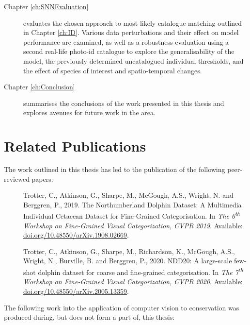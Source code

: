 \begin{description}
	\item[Chapter \ref{ch:SNNEvaluation}] evaluates the chosen approach to most likely catalogue matching outlined in Chapter \ref{ch:ID}. Various data perturbations and their effect on model performance are examined, as well as a robustness evaluation using a second real-life photo-id catalogue to explore the generalisability of the model, the previously determined uncatalogued individual thresholds, and the effect of species of interest and spatio-temporal changes.
	
	\item[Chapter \ref{ch:Conclusion}] summarises the conclusions of the work presented in this thesis and explores avenues for future work in the area.  
	 
\end{description}

\section{Related Publications}\label{ch:intro,relatedPublications}

The work outlined in this thesis has led to the publication of the following peer-reviewed papers:

\begin{description}
	\item[\cite{trotter_northumberland_2019}] Trotter, C., Atkinson, G., Sharpe, M., McGough, A.S., Wright, N. and Berggren, P., 2019. The Northumberland Dolphin Dataset: A Multimedia Individual Cetacean Dataset for Fine-Grained Categorisation. In \textit{The 6\textsuperscript{th} Workshop on Fine-Grained Visual Categorization, CVPR 2019}. Available: \href{https://doi.org/10.48550/arXiv.1908.02669}{doi.org/10.48550/arXiv.1908.02669}.
	
	\item[\cite{trotter_ndd20_2020}] Trotter, C., Atkinson, G., Sharpe, M., Richardson, K., McGough, A.S., Wright, N., Burville, B. and Berggren, P., 2020. NDD20: A large-scale few-shot dolphin dataset for coarse and fine-grained categorisation. In \textit{The 7\textsuperscript{th} Workshop on Fine-Grained Visual Categorization, CVPR 2020}. Available: \href{https://doi.org/10.48550/arXiv.2005.13359}{doi.org/10.48550/arXiv.2005.13359}.
\end{description}

\noindent The following work into the application of computer vision to conservation was produced during, but does not form a part of, this thesis:

